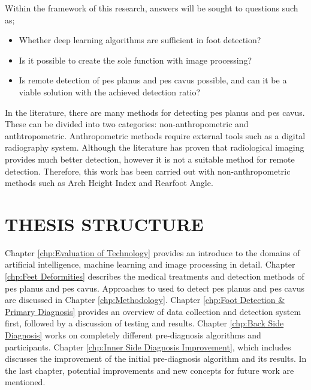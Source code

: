 Within the framework of this research, answers will be sought to questions such as;

\begin{itemize}
  \item Whether deep learning algorithms are sufficient in foot detection?
  \item Is it possible to create the sole function with image processing?
  \item Is remote detection of pes planus and pes cavus possible, and can it be a viable solution with the achieved detection ratio?
\end{itemize}

In the literature, there are many methods for detecting pes planus and pes cavus. These can be divided into two categories: non-anthropometric and anthtropometric. Anthropometric methods require external tools such as a digital radiography system. Although the literature has proven that radiological imaging provides much better detection, however it is not a suitable method for remote detection. Therefore, this work has been carried out with non-anthropometric methods such as Arch Height Index and Rearfoot Angle.

\section{THESIS STRUCTURE}

Chapter \ref{chp:Evaluation of Technology} provides an introduce to the domains of artificial intelligence, machine learning and image processing in detail. Chapter \ref{chp:Feet Deformities} describes the medical treatments and detection methods of pes planus and pes cavus. Approaches to used to detect pes planus and pes cavus are discussed in Chapter \ref{chp:Methodology}. Chapter \ref{chp:Foot Detection & Primary Diagnosis} provides an overview of data collection and detection system first, followed by a discussion of testing and results. Chapter \ref{chp:Back Side Diagnosis} works on completely different pre-diagnosis algorithms and participants. Chapter \ref{chp:Inner Side Diagnosis Improvement}, which includes discusses the improvement of the initial pre-diagnosis algorithm and its results. In the last chapter, potential improvements and new concepts for future work are mentioned.
